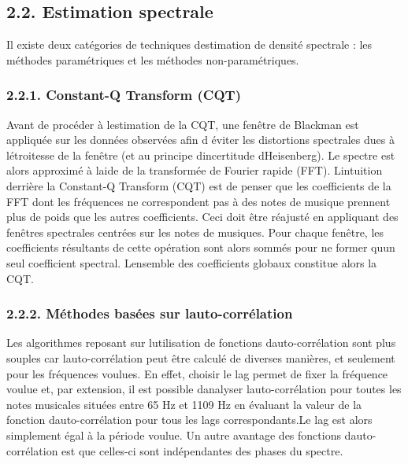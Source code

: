 \documentclass[letterpaper]{article}
\begin{document}
\subsection*{2.2. Estimation spectrale}

Il existe deux catégories de techniques d\textquotesingle estimation de densité spectrale : les méthodes paramétriques et les méthodes non-paramétriques.


\subsubsection*{2.2.1. Constant-Q Transform (CQT)}

Avant de procéder à l\textquotesingle estimation de la CQT, une fenêtre de Blackman est appliquée sur les données observées afin d\textquotesingle
 éviter les distortions spectrales dues à l\textquotesingle étroitesse de la fenêtre (et au principe d\textquotesingle incertitude d\textquotesingle Heisenberg).
Le spectre est alors approximé à l\textquotesingle aide de la transformée de Fourier rapide (FFT). L\textquotesingle intuition derrière la Constant-Q 
Transform (CQT)
est de penser que les coefficients de la FFT dont les fréquences ne correspondent pas à des notes de musique prennent plus de poids que les autres
coefficients. Ceci doit être réajusté en appliquant des fenêtres spectrales centrées sur les notes de musiques. Pour chaque fenêtre, les coefficients résultants de cette opération sont alors sommés pour ne former qu\textquotesingle un seul coefficient spectral. L\textquotesingle ensemble des coefficients globaux
constitue alors la CQT.


\subsubsection*{2.2.2. Méthodes basées sur l\textquotesingle auto-corrélation}

Les algorithmes reposant sur l\textquotesingle utilisation de fonctions d\textquotesingle auto-corrélation sont plus souples
car l\textquotesingle auto-corrélation peut être calculé de diverses manières, et seulement pour les fréquences voulues.
En effet, choisir le lag permet de fixer la fréquence voulue et, par extension, il est possible d\textquotesingle analyser
l\textquotesingle auto-corrélation pour toutes les notes musicales situées entre 65 Hz et 1109 Hz en évaluant la valeur
de la fonction d\textquotesingle auto-corrélation pour tous les lags correspondants.Le lag est alors simplement égal à la période
voulue. Un autre avantage des fonctions d\textquotesingle auto-corrélation est que celles-ci sont indépendantes des phases du spectre.
\end{document}
